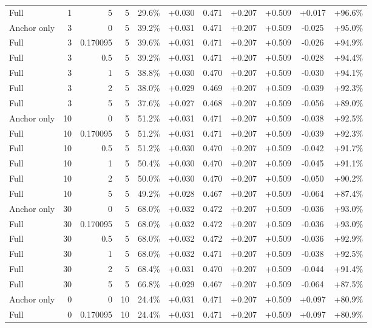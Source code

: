 \begin{table}[htbp]
\begin{tabular}{lrrrccccccc}
Full & 1 & 5 & 5 & 29.6\% & +0.030 & 0.471 & +0.207 & +0.509 & +0.017 & +96.6\% \\
Anchor only & 3 & 0 & 5 & 39.2\% & +0.031 & 0.471 & +0.207 & +0.509 & -0.025 & +95.0\% \\
Full & 3 & 0.170095 & 5 & 39.6\% & +0.031 & 0.471 & +0.207 & +0.509 & -0.026 & +94.9\% \\
Full & 3 & 0.5 & 5 & 39.2\% & +0.031 & 0.471 & +0.207 & +0.509 & -0.028 & +94.4\% \\
Full & 3 & 1 & 5 & 38.8\% & +0.030 & 0.470 & +0.207 & +0.509 & -0.030 & +94.1\% \\
Full & 3 & 2 & 5 & 38.0\% & +0.029 & 0.469 & +0.207 & +0.509 & -0.039 & +92.3\% \\
Full & 3 & 5 & 5 & 37.6\% & +0.027 & 0.468 & +0.207 & +0.509 & -0.056 & +89.0\% \\
Anchor only & 10 & 0 & 5 & 51.2\% & +0.031 & 0.471 & +0.207 & +0.509 & -0.038 & +92.5\% \\
Full & 10 & 0.170095 & 5 & 51.2\% & +0.031 & 0.471 & +0.207 & +0.509 & -0.039 & +92.3\% \\
Full & 10 & 0.5 & 5 & 51.2\% & +0.030 & 0.470 & +0.207 & +0.509 & -0.042 & +91.7\% \\
Full & 10 & 1 & 5 & 50.4\% & +0.030 & 0.470 & +0.207 & +0.509 & -0.045 & +91.1\% \\
Full & 10 & 2 & 5 & 50.0\% & +0.030 & 0.470 & +0.207 & +0.509 & -0.050 & +90.2\% \\
Full & 10 & 5 & 5 & 49.2\% & +0.028 & 0.467 & +0.207 & +0.509 & -0.064 & +87.4\% \\
Anchor only & 30 & 0 & 5 & 68.0\% & +0.032 & 0.472 & +0.207 & +0.509 & -0.036 & +93.0\% \\
Full & 30 & 0.170095 & 5 & 68.0\% & +0.032 & 0.472 & +0.207 & +0.509 & -0.036 & +93.0\% \\
Full & 30 & 0.5 & 5 & 68.0\% & +0.032 & 0.472 & +0.207 & +0.509 & -0.036 & +92.9\% \\
Full & 30 & 1 & 5 & 68.0\% & +0.032 & 0.471 & +0.207 & +0.509 & -0.038 & +92.5\% \\
Full & 30 & 2 & 5 & 68.4\% & +0.031 & 0.470 & +0.207 & +0.509 & -0.044 & +91.4\% \\
Full & 30 & 5 & 5 & 66.8\% & +0.029 & 0.467 & +0.207 & +0.509 & -0.064 & +87.5\% \\
Anchor only & 0 & 0 & 10 & 24.4\% & +0.031 & 0.471 & +0.207 & +0.509 & +0.097 & +80.9\% \\
Full & 0 & 0.170095 & 10 & 24.4\% & +0.031 & 0.471 & +0.207 & +0.509 & +0.097 & +80.9\% \\

\end{tabular}
\end{table}

